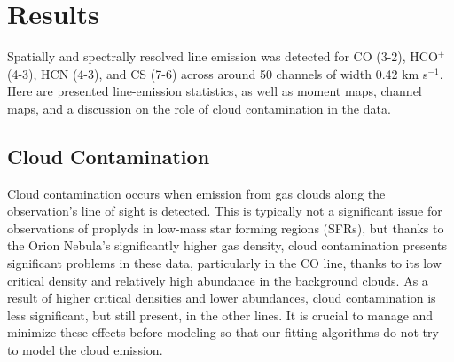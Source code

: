 \chapter{Results}
\label{chap:results}


Spatially and spectrally resolved line emission was detected for CO (3-2), HCO$^{+}$ (4-3), HCN (4-3), and CS (7-6) across around 50 channels of width 0.42 km s$^{-1}$. Here are presented line-emission statistics, as well as moment maps, channel maps, and a discussion on the role of cloud contamination in the data.


\bigskip

\section{Cloud Contamination}
\label{section:cloud_contamination}

Cloud contamination occurs when emission from gas clouds along the observation's line of sight is detected. This is typically not a significant issue for observations of proplyds in low-mass star forming regions (SFRs), but thanks to the Orion Nebula's significantly higher gas density, cloud contamination presents significant problems in these data, particularly in the CO line, thanks to its low critical density and relatively high abundance in the background clouds. As a result of higher critical densities and lower abundances, cloud contamination is less significant, but still present, in the other lines. It is crucial to manage and minimize these effects before modeling so that our fitting algorithms do not try to model the cloud emission.





